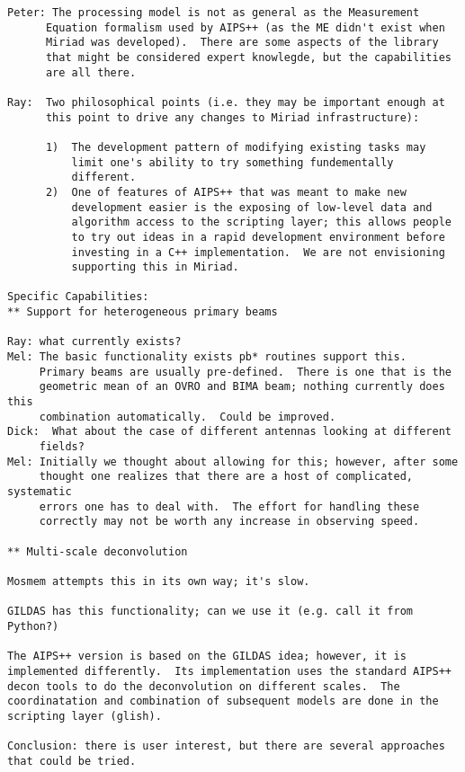 \begin{verbatim}
Peter: The processing model is not as general as the Measurement
      Equation formalism used by AIPS++ (as the ME didn't exist when
      Miriad was developed).  There are some aspects of the library
      that might be considered expert knowlegde, but the capabilities
      are all there. 

Ray:  Two philosophical points (i.e. they may be important enough at
      this point to drive any changes to Miriad infrastructure):

      1)  The development pattern of modifying existing tasks may
          limit one's ability to try something fundementally
          different. 
      2)  One of features of AIPS++ that was meant to make new
          development easier is the exposing of low-level data and
          algorithm access to the scripting layer; this allows people
          to try out ideas in a rapid development environment before
          investing in a C++ implementation.  We are not envisioning
          supporting this in Miriad.  

Specific Capabilities:
** Support for heterogeneous primary beams

Ray: what currently exists? 
Mel: The basic functionality exists pb* routines support this.
     Primary beams are usually pre-defined.  There is one that is the
     geometric mean of an OVRO and BIMA beam; nothing currently does this
     combination automatically.  Could be improved.
Dick:  What about the case of different antennas looking at different
     fields?
Mel: Initially we thought about allowing for this; however, after some
     thought one realizes that there are a host of complicated, systematic
     errors one has to deal with.  The effort for handling these
     correctly may not be worth any increase in observing speed.  

** Multi-scale deconvolution

Mosmem attempts this in its own way; it's slow.

GILDAS has this functionality; can we use it (e.g. call it from
Python?)

The AIPS++ version is based on the GILDAS idea; however, it is
implemented differently.  Its implementation uses the standard AIPS++
decon tools to do the deconvolution on different scales.  The
coordinatation and combination of subsequent models are done in the
scripting layer (glish).  

Conclusion: there is user interest, but there are several approaches
that could be tried.  


\end{verbatim}
